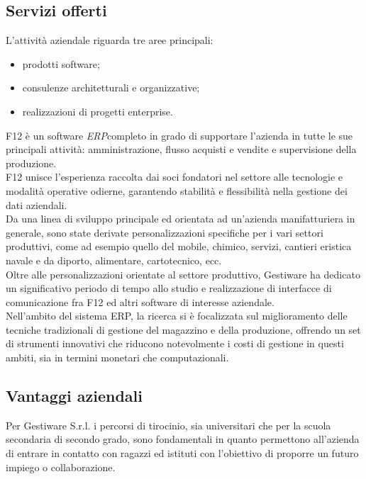 \subsection{Servizi offerti}
    L'attività aziendale riguarda tre aree principali: 
    \begin{itemize}
        \item prodotti software;
        
        \item consulenze architetturali e organizzative;
        
        \item realizzazioni di progetti enterprise.
    \end{itemize}
    F12 è un software \emph{ERP}\glsfirstoccur completo in grado di supportare l'azienda in tutte le sue principali attività: amministrazione, flusso acquisti e vendite e supervisione della produzione.
    \\
    F12 unisce l'esperienza raccolta dai soci fondatori nel settore alle tecnologie e modalità operative odierne, garantendo stabilità e flessibilità nella gestione dei dati aziendali.
    \\
    Da una linea di sviluppo principale ed orientata ad un'azienda manifatturiera in
    generale, sono state derivate personalizzazioni specifiche per i vari settori produttivi, come ad esempio quello del mobile, chimico, servizi, cantieri eristica navale e da diporto, alimentare, cartotecnico, ecc.
    \\
    Oltre alle personalizzazioni orientate al settore produttivo, Gestiware ha dedicato un
    significativo periodo di tempo allo studio e realizzazione di interfacce di comunicazione fra F12 ed altri software di interesse aziendale. 
    \\
    Nell'ambito del sistema ERP, la ricerca si è focalizzata sul miglioramento delle tecniche
    tradizionali di gestione del magazzino e della produzione, offrendo un set di strumenti
    innovativi che riducono notevolmente i costi di gestione in questi ambiti, sia in termini
    monetari che computazionali.
    
\subsection{Vantaggi aziendali}
Per Gestiware S.r.l. i percorsi di tirocinio, sia universitari che per la scuola secondaria di secondo grado, sono fondamentali in quanto permettono all'azienda di entrare in contatto con ragazzi ed istituti con l'obiettivo di proporre un futuro impiego o collaborazione.

